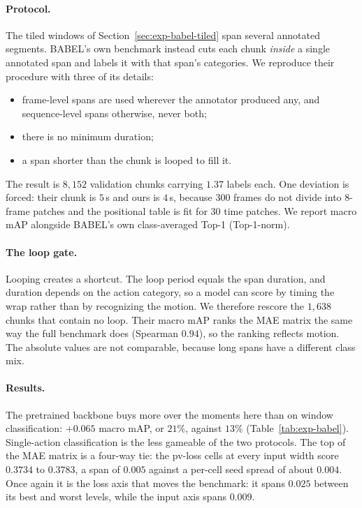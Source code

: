 \paragraph{Protocol.} The tiled windows of Section~\ref{sec:exp-babel-tiled} span several annotated segments. BABEL's own
benchmark instead cuts each chunk \emph{inside} a single annotated span and labels it with
that span's categories. We reproduce their procedure with three of its details:
\begin{itemize}
\item frame-level spans are used wherever the annotator produced any, and sequence-level
  spans otherwise, never both;
\item there is no minimum duration;
\item a span shorter than the chunk is looped to fill it.
\end{itemize}
The result is $8{,}152$ validation chunks carrying $1.37$ labels each. One deviation is
forced: their chunk is $5$\,s and ours is $4$\,s, because $300$ frames do not divide into
$8$-frame patches and the positional table is fit for $30$ time patches. We report macro mAP
alongside BABEL's own class-averaged Top-1 (Top-1-norm).

\paragraph{The loop gate.} Looping creates a shortcut. The loop period equals the span
duration, and duration depends on the action category, so a model can score by timing the
wrap rather than by recognizing the motion. We therefore rescore the $1{,}638$ chunks that
contain no loop. Their macro mAP ranks the MAE matrix the same way the full benchmark does
(Spearman $0.94$), so the ranking reflects motion. The absolute values are not comparable,
because long spans have a different class mix.

\paragraph{Results.} The pretrained backbone buys more over the moments here than on window
classification: $+0.065$ macro mAP, or $21\%$, against $13\%$ (Table~\ref{tab:exp-babel}). Single-action
classification is the less gameable of the two protocols. The top of the MAE matrix is a
four-way tie: the \textsf{pv}-loss cells at every input width score $0.3734$ to $0.3783$, a
span of $0.005$ against a per-cell seed spread of about $0.004$. Once again it is the loss
axis that moves the benchmark: it spans $0.025$ between its best and worst levels, while
the input axis spans $0.009$.


